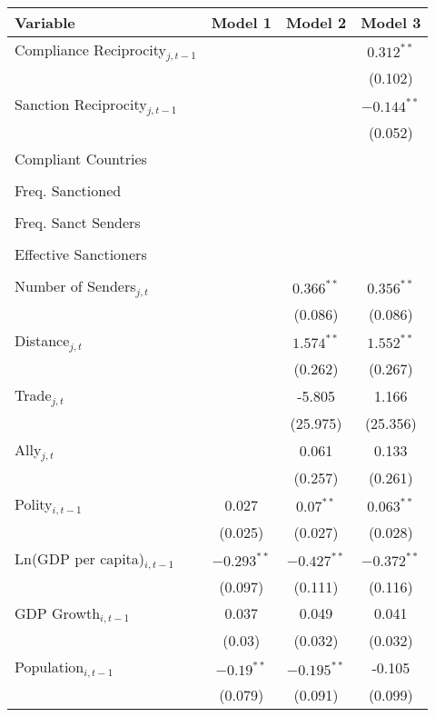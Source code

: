 \begin{table}[ht]
\centering
{\normalsize
\begin{tabular}{lccc}
 Variable & Model 1 & Model 2 & Model 3 \\ 
  \hline
\hline
Compliance Reciprocity$_{j,t-1}$ &  &  & $0.312^{\ast\ast}$ \\ 
   &  &  & (0.102) \\ 
  Sanction Reciprocity$_{j,t-1}$ &  &  & $-0.144^{\ast\ast}$ \\ 
   &  &  & (0.052) \\ 
   \hline
Compliant Countries &  &  &  \\ 
   &  &  &  \\ 
  Freq. Sanctioned &  &  &  \\ 
   &  &  &  \\ 
  Freq. Sanct Senders &  &  &  \\ 
   &  &  &  \\ 
  Effective Sanctioners &  &  &  \\ 
   &  &  &  \\ 
   \hline
Number of Senders$_{j,t}$ &  & $0.366^{\ast\ast}$ & $0.356^{\ast\ast}$ \\ 
   &  & (0.086) & (0.086) \\ 
  Distance$_{j,t}$ &  & $1.574^{\ast\ast}$ & $1.552^{\ast\ast}$ \\ 
   &  & (0.262) & (0.267) \\ 
  Trade$_{j,t}$ &  & -5.805 & 1.166 \\ 
   &  & (25.975) & (25.356) \\ 
  Ally$_{j,t}$ &  & 0.061 & 0.133 \\ 
   &  & (0.257) & (0.261) \\ 
  Polity$_{i,t-1}$ & 0.027 & $0.07^{\ast\ast}$ & $0.063^{\ast\ast}$ \\ 
   & (0.025) & (0.027) & (0.028) \\ 
  Ln(GDP per capita)$_{i,t-1}$ & $-0.293^{\ast\ast}$ & $-0.427^{\ast\ast}$ & $-0.372^{\ast\ast}$ \\ 
   & (0.097) & (0.111) & (0.116) \\ 
  GDP Growth$_{i,t-1}$ & 0.037 & 0.049 & 0.041 \\ 
   & (0.03) & (0.032) & (0.032) \\ 
  Population$_{i,t-1}$ & $-0.19^{\ast\ast}$ & $-0.195^{\ast\ast}$ & -0.105 \\ 
   & (0.079) & (0.091) & (0.099) \\ 

\end{tabular}}
\end{table}
